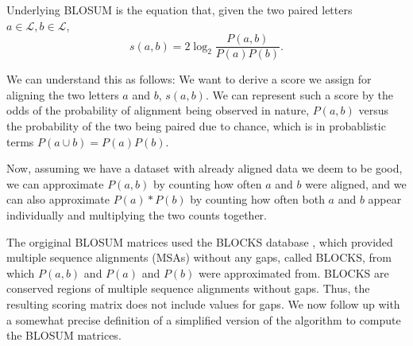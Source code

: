 \documentclass{article}
\begin{document}
Underlying BLOSUM is the equation that, given the two paired letters $a \in
    \mathcal L, b \in \mathcal L$,
\begin{equation*}
    s(a, b)= 2 \log_2 \frac{P(a, b)}{P(a)P(b)}.
\end{equation*}

We can understand this as follows: We want to derive a score we assign
for aligning the two letters $a$ and $b$, $s(a,b)$. We can represent such
a score by the odds of the probability of alignment being observed in nature,
$P(a, b)$ versus the probability of the two being paired due to chance, which is
in probablistic terms $P(a \cup b) = P(a)P(b)$.

Now, assuming we have a dataset with already aligned data we deem to be good, we
can approximate $P(a, b)$ by counting how often $a$ and $b$ were aligned, and
we can also approximate $P(a)*P(b)$ by counting how often both $a$ and $b$ appear
individually and multiplying the two counts together.

The orgiginal BLOSUM matrices used the BLOCKS database
\cite{henikoffAutomatedAssemblyProtein1991}, which provided multiple sequence
alignments (MSAs) without any gaps, called BLOCKS, from which $P(a, b)$ and $P(a)$ and $P(b)$
were approximated from. BLOCKS are conserved regions of multiple sequence alignments without
gaps. Thus, the resulting scoring matrix does not include values for gaps. We now follow up with
a somewhat precise definition of a simplified version of the algorithm to compute the BLOSUM matrices.
\end{document}
